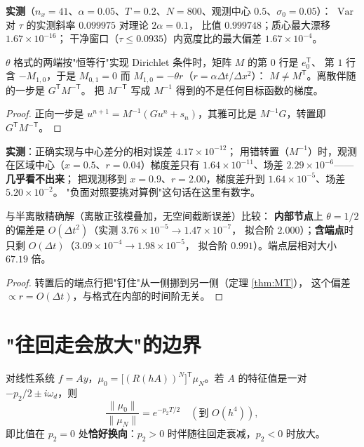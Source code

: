 \textbf{实测}（$n_x=41$、$\alpha=0.05$、$T=0.2$、$N=800$、观测中心 $0.5$、$\sigma_0=0.05$）：
$\operatorname{Var}$ 对 $\tau$ 的实测斜率 $0.099975$ 对理论 $2\alpha=0.1$，
比值 $0.999748$；质心最大漂移 $1.67\times10^{-16}$；
干净窗口（$\tau\le0.0935$）内宽度比的最大偏差 $1.67\times10^{-4}$。

\begin{theorem}\label{thm:MT}
$\theta$ 格式的两端按"恒等行"实现 Dirichlet 条件时，矩阵 $M$ 的第 $0$ 行是 $e_0^{\mathsf T}$、
第 $1$ 行含 $-M_{1,0}$，于是 $M_{0,1}=0$ 而 $M_{1,0}=-\theta r$（$r=\alpha\Delta t/\Delta x^2$）：
$M\neq M^{\mathsf T}$。离散伴随的一步是 $G^{\mathsf T}M^{-\mathsf T}$。
把 $M^{-\mathsf T}$ 写成 $M^{-1}$ 得到的不是任何目标函数的梯度。
\end{theorem}

\begin{proof}
正向一步是 $u^{n+1}=M^{-1}(Gu^n+s_n)$，其雅可比是 $M^{-1}G$，转置即 $G^{\mathsf T}M^{-\mathsf T}$。
\end{proof}

\textbf{实测}：正确实现与中心差分的相对误差 $4.17\times10^{-12}$；
用错转置（$M^{-1}$）时，观测在区域中心（$x=0.5$、$r=0.04$）梯度差只有
$1.64\times10^{-11}$、场差 $2.29\times10^{-6}$——\textbf{几乎看不出来}；
把观测移到 $x=0.9$、$r=2.00$，梯度差升到 $1.64\times10^{-5}$、场差 $5.20\times10^{-2}$。
"负面对照要挑对算例"这句话在这里有数字。

\begin{corollary}\label{cor:boundary-order}
与半离散精确解（离散正弦模叠加，无空间截断误差）比较：
\textbf{内部节点}上 $\theta=1/2$ 的偏差是 $O(\Delta t^2)$（实测 $3.76\times10^{-5}\to1.47\times10^{-7}$，
拟合阶 $2.000$）；\textbf{含端点}时只剩 $O(\Delta t)$（$3.09\times10^{-4}\to1.98\times10^{-5}$，
拟合阶 $0.991$）。端点层相对大小 $67.19$ 倍。
\end{corollary}

\begin{proof}
转置后的端点行把"钉住"从一侧挪到另一侧（定理 \ref{thm:MT}），
这个偏差 $\propto r=O(\Delta t)$，与格式在内部的时间阶无关。
\end{proof}

\section{"往回走会放大"的边界}

\begin{theorem}[伴随放大率 = 正向压缩率的倒数]\label{thm:growth}
对线性系统 $f=Ay$，$\mu_0=\bigl[(R(hA))^N\bigr]^{\mathsf T}\mu_N$。若 $A$ 的特征值是一对
$-p_2/2\pm i\omega_d$，则
\[
\frac{\|\mu_0\|}{\|\mu_N\|}=e^{-p_2T/2}\quad(\text{到 }O(h^4)),
\]
即比值在 $p_2=0$ 处\textbf{恰好换向}：$p_2>0$ 时伴随往回走衰减，$p_2<0$ 时放大。
\end{theorem}


